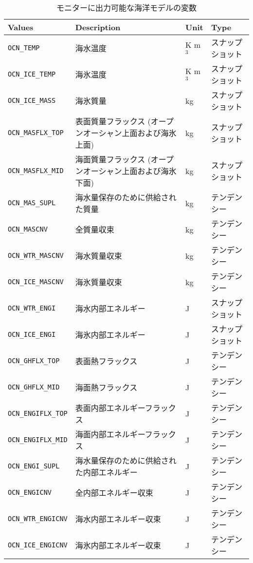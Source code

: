 \begin{table}[h]
\begin{center}
  \caption{モニターに出力可能な海洋モデルの変数}
  \label{tab:varlist_monitor_ocean}
  \begin{tabularx}{150mm}{|l|X|l|l|} \hline
    \rowcolor[gray]{0.9}  Values & Description & Unit & Type \\ \hline
      \verb|OCN_TEMP|        & 海水温度                 & K m$^3$ & スナップショット \\
      \verb|OCN_ICE_TEMP|    & 海氷温度                 & K m$^3$ & スナップショット \\
      \verb|OCN_ICE_MASS|    & 海氷質量                 & kg   & スナップショット \\
      \verb|OCN_MASFLX_TOP|  & 表面質量フラックス (オープンオーシャン上面および海氷上面) & kg & スナップショット \\
      \verb|OCN_MASFLX_MID|  & 海面質量フラックス (オープンオーシャン上面および海氷下面) & kg & スナップショット \\
      \verb|OCN_MAS_SUPL|    & 海水量保存のために供給された質量        & kg   & テンデンシー \\
      \verb|OCN_MASCNV|      & 全質量収束                            & kg   & テンデンシー \\
      \verb|OCN_WTR_MASCNV|  & 海水質量収束                          & kg   & テンデンシー \\
      \verb|OCN_ICE_MASCNV|  & 海氷質量収束                          & kg   & テンデンシー \\
      \verb|OCN_WTR_ENGI|    & 海水内部エネルギー                     & J    & スナップショット \\
      \verb|OCN_ICE_ENGI|    & 海氷内部エネルギー                     & J    & スナップショット \\
      \verb|OCN_GHFLX_TOP|   & 表面熱フラックス                       & J    & テンデンシー \\
      \verb|OCN_GHFLX_MID|   & 海面熱フラックス                       & J    & テンデンシー \\
      \verb|OCN_ENGIFLX_TOP| & 表面内部エネルギーフラックス             & J    & テンデンシー \\
      \verb|OCN_ENGIFLX_MID| & 海面内部エネルギーフラックス             & J    & テンデンシー \\
      \verb|OCN_ENGI_SUPL|   & 海水量保存のために供給された内部エネルギー & J    & テンデンシー \\
      \verb|OCN_ENGICNV|     & 全内部エネルギー収束                    & J    & テンデンシー \\
      \verb|OCN_WTR_ENGICNV| & 海水内部エネルギー収束                  & J    & テンデンシー \\
      \verb|OCN_ICE_ENGICNV| & 海氷内部エネルギー収束                  & J    & テンデンシー \\
    \hline
  \end{tabularx}
\end{center}
\end{table}

